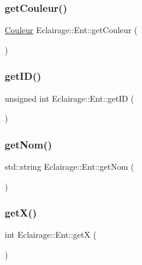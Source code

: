 \subsubsection{\texorpdfstring{get\+Couleur()}{getCouleur()}}
{\footnotesize\ttfamily \hyperlink{Couleur_8h_aa304d0ca681f782b1d7735da33037dd7}{Couleur} Eclairage\+::\+Ent\+::get\+Couleur (\begin{DoxyParamCaption}{ }\end{DoxyParamCaption})}

\mbox{\label{classEclairage_1_1Ent_a503507f6dc76a84b54e22ef21d9f301d}} 
\subsubsection{\texorpdfstring{get\+I\+D()}{getID()}}
{\footnotesize\ttfamily unsigned int Eclairage\+::\+Ent\+::get\+ID (\begin{DoxyParamCaption}{ }\end{DoxyParamCaption})}

\mbox{\label{classEclairage_1_1Ent_ae440f0f45ec8f6d11e54c1a0ebe8d5c1}} 
\subsubsection{\texorpdfstring{get\+Nom()}{getNom()}}
{\footnotesize\ttfamily std\+::string Eclairage\+::\+Ent\+::get\+Nom (\begin{DoxyParamCaption}{ }\end{DoxyParamCaption})}

\mbox{\label{classEclairage_1_1Ent_a0b54632cd5ff1bcb588c4f8527361990}} 
\subsubsection{\texorpdfstring{get\+X()}{getX()}}
{\footnotesize\ttfamily int Eclairage\+::\+Ent\+::getX (\begin{DoxyParamCaption}{ }\end{DoxyParamCaption})}


